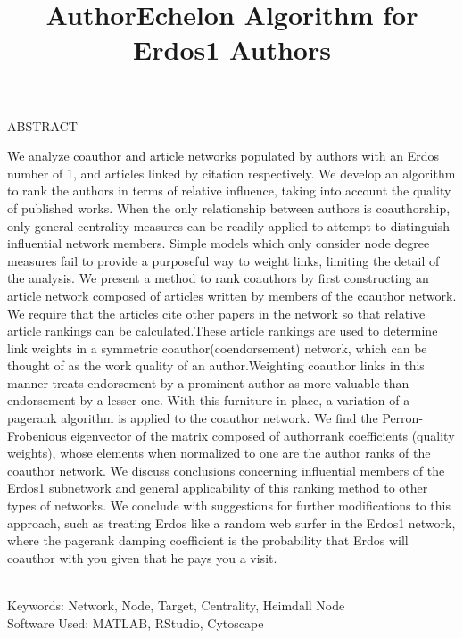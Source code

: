 \documentclass[20pt]{extarticle}
\title{AuthorEchelon Algorithm for Erdos1 Authors}
\begin{document}


\maketitle
\thispagestyle{fancy}

\begin{center}
ABSTRACT
\end{center}

\indent


\begin{small}
\indent
 We analyze coauthor and article networks populated by authors with an Erdos number of 1, and articles linked by citation respectively.  We develop an algorithm to rank the authors in terms of relative influence, taking into account the quality of published works. When the only relationship between authors is coauthorship, only general centrality measures can be readily applied to attempt to distinguish influential network members. Simple models which only consider node degree measures fail to provide a purposeful way to weight links, limiting the detail of the analysis. We present a method to rank coauthors by first constructing an article network composed of articles written by members of the coauthor network. We require that the articles cite other papers in the network so that relative article rankings can be calculated.These article rankings are used to determine link weights in a symmetric coauthor(coendorsement) network, which can be thought of as the work quality of an author.Weighting coauthor links in this manner treats endorsement by a prominent author as more valuable than endorsement by a lesser one. With this furniture in place, a variation of a pagerank algorithm is applied to the coauthor network. We find the Perron-Frobenious eigenvector of the matrix composed of authorrank coefficients (quality weights), whose elements when normalized to one are the author ranks of the coauthor network. We discuss conclusions concerning influential members of the Erdos1 subnetwork and general applicability of this ranking method to other types of networks. We conclude with suggestions for further modifications to this approach, such as treating Erdos like a random web surfer in the Erdos1 network, where the pagerank damping coefficient is the probability that Erdos will coauthor with you given that he pays you a visit.

\quad \\
Keywords: Network, Node, Target, Centrality, Heimdall Node \\
Software Used: MATLAB, RStudio, Cytoscape

\end{small}
\end{document}
